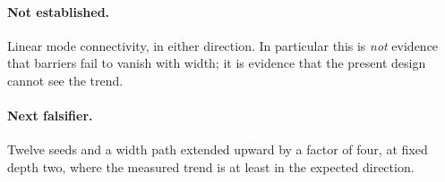 \paragraph{Not established.}
Linear mode connectivity, in either direction. In particular this is
\emph{not} evidence that barriers fail to vanish with width; it is evidence
that the present design cannot see the trend.

\paragraph{Next falsifier.}
Twelve seeds and a width path extended upward by a factor of four, at fixed
depth two, where the measured trend is at least in the expected direction.
